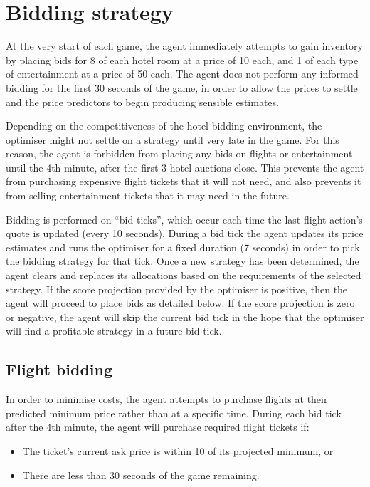 \documentclass{acm_proc_article-sp}
\begin{document}
\section{Bidding strategy}

At the very start of each game, the agent immediately attempts to gain inventory by placing bids for 8 of each hotel room at a price of 10 each, and 1 of each type of entertainment at a price of 50 each. The agent does not perform any informed bidding for the first 30 seconds of the game, in order to allow the prices to settle and the price predictors to begin producing sensible estimates.

Depending on the competitiveness of the hotel bidding environment, the optimiser might not settle on a strategy until very late in the game. For this reason, the agent is forbidden from placing any bids on flights or entertainment until the 4th minute, after the first 3 hotel auctions close. This prevents the agent from purchasing expensive flight tickets that it will not need, and also prevents it from selling entertainment tickets that it may need in the future.

Bidding is performed on ``bid ticks'', which occur each time the last flight action's quote is updated (every 10 seconds). During a bid tick the agent updates its price estimates and runs the optimiser for a fixed duration (7 seconds) in order to pick the bidding strategy for that tick. Once a new strategy has been determined, the agent clears and replaces its allocations based on the requirements of the selected strategy. If the score projection provided by the optimiser is positive, then the agent will proceed to place bids as detailed below. If the score projection is zero or negative, the agent will skip the current bid tick in the hope that the optimiser will find a profitable strategy in a future bid tick.

\subsection{Flight bidding}

In order to minimise costs, the agent attempts to purchase flights at their predicted minimum price rather than at a specific time. During each bid tick after the 4th minute, the agent will purchase required flight tickets if:

\begin{itemize}
  \item The ticket's current ask price is within 10 of its projected minimum, or
  \item There are less than 30 seconds of the game remaining.
\end{itemize}
\end{document}
